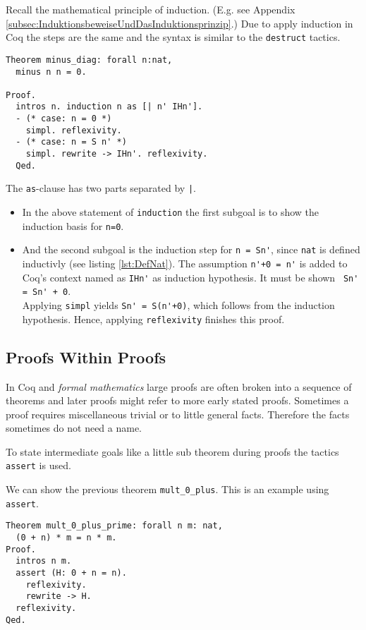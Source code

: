 Recall the mathematical principle of induction. (E.g. see Appendix \ref{subsec:InduktionsbeweiseUndDasInduktionsprinzip}.)
Due to apply induction in Coq the steps are the same and the syntax is similar to the \lstinline!destruct! tactics.
 

\begin{lstlisting}[caption = \lstinline!minus_diag!, label =lst:minus_diag] 
Theorem minus_diag: forall n:nat,
  minus n n = 0.
  
Proof.
  intros n. induction n as [| n' IHn'].
  - (* case: n = 0 *)
    simpl. reflexivity.
  - (* case: n = S n' *)
    simpl. rewrite -> IHn'. reflexivity.  
  Qed.
\end{lstlisting}

The \lstinline!as!-clause has two parts separated by \lstinline!|!.
\begin{itemize}
	\item In the above statement of \lstinline!induction! the first subgoal is to show the induction basis for \lstinline!n=0!.
	\item And the second subgoal is the induction step for \lstinline!n = Sn'!, since \lstinline!nat! is defined inductivly (see listing  \ref{lst:DefNat}).
	      The assumption \lstinline!n'+0 = n'! is added to Coq's context named as \lstinline!IHn'! as induction hypothesis.
		  It must be shown \lstinline! Sn' = Sn' + 0!. \\
          Applying \lstinline!simpl! yields \lstinline!Sn' = S(n'+0)!, which follows from the induction hypothesis. 
          Hence, applying \lstinline!reflexivity! finishes this proof.
\end{itemize} 

\subsection{Proofs Within Proofs}

In Coq and {\itshape formal mathematics} large proofs are often broken into a sequence of theorems and later proofs might refer to more early stated proofs.
Sometimes a proof requires miscellaneous trivial or to little general facts. 
Therefore the facts sometimes do not need a name.

To state intermediate goals like a little sub theorem during proofs the tactics \lstinline!assert! is used.


\begin{example}
We can show the previous theorem \lstinline!mult_0_plus!. 
This is an example using \lstinline!assert!. 

\begin{lstlisting}[caption = \lstinline!mult_0_plus'!, label = lst:mult_0_plus_prime]
Theorem mult_0_plus_prime: forall n m: nat,
  (0 + n) * m = n * m. 
Proof.
  intros n m.
  assert (H: 0 + n = n).  
  	reflexivity. 
  	rewrite -> H.
  reflexivity.  
Qed.
\end{lstlisting}
\end{example}

